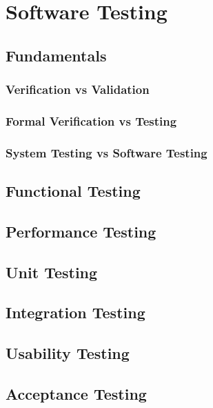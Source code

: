 \chapter{Software Testing}
\label{ch:test}


\section{Fundamentals}


\subsection{Verification vs Validation}


\subsection{Formal Verification vs Testing}


\subsection{System Testing vs Software Testing}


\section{Functional Testing}


\section{Performance Testing}


\section{Unit Testing}


\section{Integration Testing}


\section{Usability Testing}


\section{Acceptance Testing}
